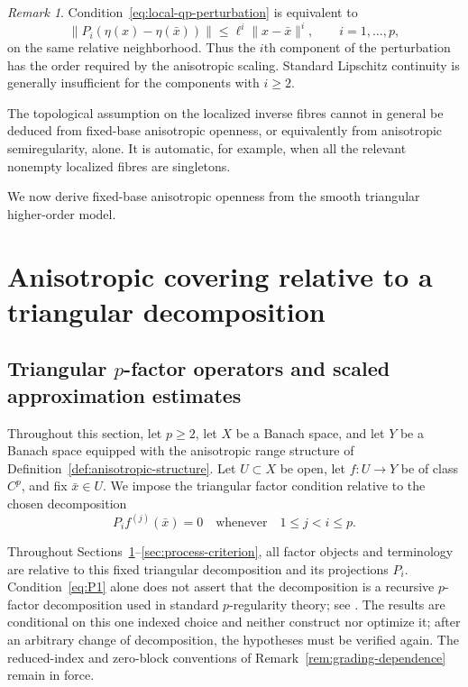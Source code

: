 \documentclass[11pt]{amsart}
\theoremstyle{definition}
\theoremstyle{remark}
\newtheorem{remark}[theorem]{Remark}
\newcommand{\bx}{\bar x}
\begin{document}
	\begin{remark}
		Condition~\eqref{eq:local-qp-perturbation} is equivalent to
		$$
		\|P_i(\eta(x)-\eta(\bx))\|
		\le
		\ell^i\|x-\bx\|^i,
		\qquad i=1,\ldots,p,
		$$
		on the same relative neighborhood.  Thus the $i$th component of the
		perturbation has the order required by the anisotropic scaling.  Standard
		Lipschitz continuity is generally insufficient for the components with
		$i\ge2$.
		
		The topological assumption on the localized inverse fibres cannot in
		general be deduced from fixed-base anisotropic openness, or equivalently
		from anisotropic semiregularity, alone.  It is
		automatic, for example, when all the relevant nonempty localized fibres
		are singletons.
	\end{remark}
	
	
	We now derive fixed-base anisotropic openness from the smooth triangular
	higher-order model.
	
	\section{Anisotropic covering relative to a triangular decomposition}
	\label{sec:p-factor}
	
	\subsection{Triangular $p$-factor operators and scaled approximation estimates}
	
	Throughout this section, let $p\ge2$, let $X$ be a Banach space, and let
	$Y$ be a Banach space equipped with the anisotropic range structure of
	Definition~\ref{def:anisotropic-structure}.  Let $U\subset X$ be open, let
	$f:U\longrightarrow Y$ be of class $C^p$, and fix $\bx\in U$.  We impose
	the triangular factor condition relative to the chosen decomposition
	\begin{equation}
		P_i f^{(j)}(\bx)=0
		\quad\text{whenever}\quad 1\le j<i\le p.
		\label{eq:P1}
	\end{equation}
	
	Throughout Sections~\ref{sec:p-factor}--\ref{sec:process-criterion}, all
	factor objects and terminology are relative to this fixed triangular
	decomposition and its projections $P_i$.  Condition~\eqref{eq:P1} alone
	does not assert that the decomposition is a recursive $p$-factor
	decomposition used in standard $p$-regularity theory; see
	\cite[Section~3, equations~(15)--(19)]{BednarczukEtAlSurvey}.
	The results are conditional on this one indexed choice and neither
	construct nor optimize it; after an arbitrary change of decomposition,
	the hypotheses must be verified again.  The reduced-index and zero-block
	conventions of Remark~\ref{rem:grading-dependence} remain in force.
	
\end{document}
